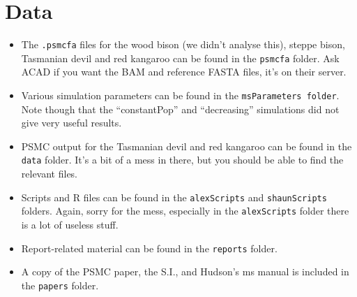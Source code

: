 \documentclass[11pt,a4paper]{article}
\begin{document}
\section{Data}
\begin{itemize}
\item The \verb|.psmcfa| files for the wood bison (we didn't analyse this), steppe bison, Tasmanian devil and red kangaroo can be found in the \verb|psmcfa| folder. Ask ACAD if you want the BAM and reference FASTA files, it's on their server.
\item Various simulation parameters can be found in the \verb|msParameters folder|. Note though that the ``constantPop'' and ``decreasing'' simulations did not give very useful results.
\item PSMC output for the Tasmanian devil and red kangaroo can be found in the \verb|data| folder. It's a bit of a mess in there, but you should be able to find the relevant files.
\item Scripts and R files can be found in the \verb|alexScripts| and \verb|shaunScripts| folders. Again, sorry for the mess, especially in the \verb|alexScripts| folder there is a lot of useless stuff.
\item Report-related material can be found in the \verb|reports| folder.
\item A copy of the PSMC paper, the S.I., and Hudson's ms manual is included in the \verb|papers| folder.
\end{itemize}
\end{document}
